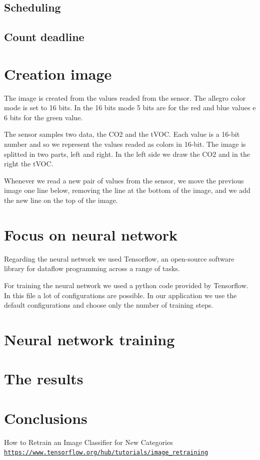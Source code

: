 \documentclass[12pt]{article}
\begin{document}
\subsection{Scheduling}
\subsection{Count deadline}

\section{Creation image}
The image is created from the values readed from the sensor. The allegro color 
mode is set to 16 bits. In the 16 bits mode 5 bits are for the red and blue 
values e 6 bits for the green value. 

The sensor samples two data, the CO2 and the tVOC. Each value is a 16-bit number
and so we represent the values readed as colors in 16-bit. The image is splitted
in two parts, left and right. In the left side we draw the CO2 and in the right 
the tVOC.

Whenever we read a new pair of values from the sensor, we move the previous 
image one line below, removing the line at the bottom of the image, and we add 
the new line on the top of the image.

\section{Focus on neural network}
Regarding the neural network we used Tensorflow, an open-source software 
library for dataflow programming across a range of tasks. 

For training the neural network we used a python code \cite{retrain} provided by
Tensorflow. In this file a lot of configurations are possible. In our 
application we use the default configurations and choose only the number of 
training steps.

\section{Neural network training}

\section{The results}

\section{Conclusions}

\begin{thebibliography}{9}
How to Retrain an Image Classifier for New Categories 
\texttt{\hyperlink{How to Retrain an Image Classifier for New 
Categories}{https://www.tensorflow.org/hub/tutorials/image\_retraining}}

\end{thebibliography}
\end{document}
